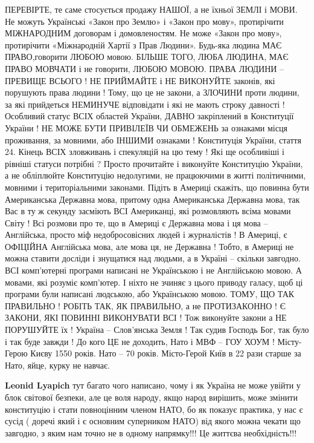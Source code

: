 \begin{itemize}
ПЕРЕВІРТЕ, те саме стосується продажу НАШОЇ, а не їхньої ЗЕМЛІ і МОВИ. Не
можуть Українські «Закон про Землю» і «Закон про мову», протирічити МІЖНАРОДНИМ
договорам і домовленостям. Не може «Закон про мову», протирічити «Міжнародній
Хартії з Прав Людини». Будь-яка людина МАЄ ПРАВО,говорити ЛЮБОЮ мовою. БІЛЬШЕ
ТОГО, ЛЮБА ЛЮДИНА, МАЄ ПРАВО МОВЧАТИ і не говорити, ЛЮБОЮ МОВОЮ. ПРАВА ЛЮДИНИ –
ПРЕВИЩЕ ВСЬОГО ! НЕ ПРИЙМАЙТЕ і НЕ ВИКОНУЙТЕ законів, які порушують права
людини ! Тому, що це не закони, а ЗЛОЧИНИ проти людини, за які прийдеться
НЕМИНУЧЕ відповідати і які не мають строку давності ! Особливий статус ВСІХ
областей України, ДАВНО закріплений в Конституції України ! НЕ МОЖЕ БУТИ
ПРИВІЛЕЇВ ЧИ ОБМЕЖЕНЬ за ознаками місця проживання, за мовними, або ІНШИМИ
ознаками ! Конституція України, стаття 24. Кінець ВСІХ зловживань і спекуляцій
на цю тему ! Які ще особливіші і рівніші статуси потрібні ? Просто прочитайте і
виконуйте Конституцію України, а не обліплюйте Конституцію недолугими, не
працюючими в житті політичними, мовними і територіальними законами. Підіть в
Америці скажіть, що повинна бути Американська Державна мова, притому одна
Американська Державна мова, так Вас в ту ж секунду засміють ВСІ Американці, які
розмовляють всіма мовами Світу ! Всі розмови про те, що в Америці є Державна
мова і ця мова – Англійська, просто міф недобросовісних людей і журналістів ! В
Америці, є ОФІЦІЙНА Англійська мова, але мова ця, не Державна ! Тобто, в
Америці не можна ставити досліди і знущатися над людьми, а в Україні – скільки
завгодно. ВСІ комп’ютерні програми написані не Українською і не Англійською
мовою. А мовами, які розуміє комп’ютер. І ніхто не зчиняє з цього приводу
галасу, щоб ці програми були написані людською, або Українською мовою. ТОМУ, ЩО
ТАК ПРАВИЛЬНО ! РОБІТЬ ТАК, ЯК ПРАВИЛЬНО, а не ПРОТИЗАКОННО ! Є ЗАКОНИ, ЯКІ
ПОВИННІ ВИКОНУВАТИ ВСІ ! Тож виконуйте закони а НЕ ПОРУШУЙТЕ їх ! Україна –
Слов’янська Земля ! Так судив Господь Бог, так було і так буде завжди ! До кого
ЦЕ не доходить, Нато і МВФ – ГОУ ХОУМ ! Місту-Герою Києву 1550 років. Нато – 70
років. Місто-Герой Київ в 22 рази старше за Нато, яйце, курку не навчає.

\begin{itemize}
 
\textbf{Leonid Lyapich} тут багато чого написано, чому і як Україна не
може увійти у блок світової безпеки, але це воля народу, якщо народ вирішить,
може змінити конституцію і стати повноцінним членом НАТО, бо як показує
практика, у нас є сусід ( доречі який і є основним суперником НАТО) від якого
можна чекати що завгодно, з яким нам точно не в одному напрямку!!!  Це життєва
необхідність!!!
\end{itemize}


\end{itemize}
